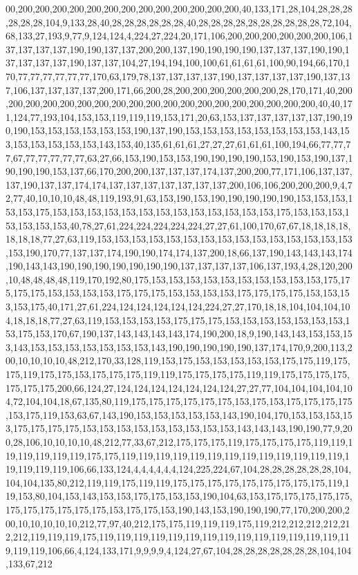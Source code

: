 00,200,200,200,200,200,200,200,200,200,200,200,200,200,40,133,171,28,104,28,28,28,28,28,28,104,9,133,28,40,28,28,28,28,28,28,40,28,28,28,28,28,28,28,28,28,28,72,104,68,133,27,193,9,77,9,124,124,4,224,27,224,20,171,106,200,200,200,200,200,200,106,137,137,137,137,190,190,137,137,200,200,137,190,190,190,190,137,137,137,190,190,137,137,137,137,190,137,137,104,27,194,194,100,100,61,61,61,61,100,90,194,66,170,170,77,77,77,77,77,77,170,63,179,78,137,137,137,137,190,137,137,137,137,190,137,137,106,137,137,137,137,200,171,66,200,28,200,200,200,200,200,200,28,170,171,40,200,200,200,200,200,200,200,200,200,200,200,200,200,200,200,200,200,200,200,40,40,171,124,77,193,104,153,153,119,119,119,153,171,20,63,153,137,137,137,137,137,190,190,190,153,153,153,153,153,153,190,137,190,153,153,153,153,153,153,153,153,143,153,153,153,153,153,153,143,153,40,135,61,61,61,27,27,27,61,61,61,100,194,66,77,77,77,67,77,77,77,77,77,63,27,66,153,190,153,153,190,190,190,190,153,190,153,190,137,190,190,190,153,137,66,170,200,200,137,137,137,174,137,200,200,77,171,106,137,137,137,190,137,137,174,174,137,137,137,137,137,137,137,200,106,106,200,200,200,9,4,72,77,40,10,10,10,48,48,119,193,91,63,153,190,153,190,190,190,190,190,153,153,153,153,153,175,153,153,153,153,153,153,153,153,153,153,153,153,153,175,153,153,153,153,153,153,153,40,78,27,61,224,224,224,224,224,27,27,61,100,170,67,67,18,18,18,18,18,18,18,77,27,63,119,153,153,153,153,153,153,153,153,153,153,153,153,153,153,153,153,190,170,77,137,137,174,190,190,174,174,137,200,18,66,137,190,143,143,143,174,190,143,143,190,190,190,190,190,190,190,137,137,137,137,106,137,193,4,28,120,200,10,48,48,48,48,119,170,192,80,175,153,153,153,153,153,153,153,153,153,153,175,175,175,175,153,153,153,153,175,175,175,153,153,153,153,175,175,175,175,153,153,153,153,175,40,171,27,61,224,124,124,124,124,124,224,27,27,170,18,18,104,104,104,104,18,18,18,77,27,63,119,153,153,153,153,175,175,175,153,153,153,153,153,153,153,153,175,153,170,67,190,137,143,143,143,143,174,190,200,18,9,190,143,143,153,153,153,143,153,153,153,153,153,153,153,143,190,190,190,190,190,137,174,170,9,200,113,200,10,10,10,10,48,212,170,33,128,119,153,175,153,153,153,153,153,175,175,119,175,175,119,175,175,153,175,175,175,119,119,175,175,175,175,119,119,175,175,175,175,175,175,175,200,66,124,27,124,124,124,124,124,124,124,27,27,77,104,104,104,104,104,72,104,104,18,67,135,80,119,175,175,175,175,175,175,153,175,153,175,175,175,175,153,175,119,153,63,67,143,190,153,153,153,153,153,143,190,104,170,153,153,153,153,175,175,175,175,153,153,153,153,153,153,153,153,153,143,143,143,190,190,77,9,200,28,106,10,10,10,10,48,212,77,33,67,212,175,175,175,119,175,175,175,175,119,119,119,119,119,119,119,175,175,119,119,119,119,119,119,119,119,119,119,119,119,119,119,119,119,119,106,66,133,124,4,4,4,4,4,4,124,225,224,67,104,28,28,28,28,28,28,104,104,104,135,80,212,119,119,175,119,119,175,175,175,175,175,175,175,175,175,119,119,153,80,104,153,143,153,153,175,175,153,153,190,104,63,153,175,175,175,175,175,175,175,175,175,175,175,153,175,175,153,190,143,153,190,190,190,77,170,200,200,200,10,10,10,10,10,212,77,97,40,212,175,175,119,119,119,175,119,212,212,212,212,212,212,119,119,119,175,119,119,119,119,119,119,119,119,119,119,119,119,119,119,119,119,119,106,66,4,124,133,171,9,9,9,9,4,124,27,67,104,28,28,28,28,28,28,28,104,104,133,67,212